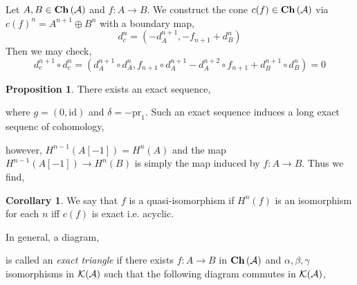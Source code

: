 \documentclass[12pt]{extarticle}
\newcommand{\id}{\mathrm{id}}
\theoremstyle{definition}
\newtheorem{proposition}[theorem]{Proposition}
\newtheorem{corollary}[theorem]{Corollary}
\newenvironment{definition}[1][Definition:]{\begin{trivlist}
\item[\hskip \labelsep {\bfseries #1}]}{\end{trivlist}}
\begin{document}
\begin{definition}
Let $A, B \in \mathbf{Ch}\left( \mathcal{A} \right)$ and $f : A \to B$. We construct the cone $c(f) \in \mathbf{Ch}\left( \mathcal{A} \right)$ via $c(f)^n = A^{n + 1} \oplus B^n$ with a boundary map,
\[ d_c^n = ( -d_A^{n+1}, -f_{n+1} + d_B^{n} ) \]
Then we may check,
\[ d_c^{n+1} \circ d_c^n = ( d_A^{n+1} \circ d_A^n, f_{n+1} \circ d_A^{n+1} - d_A^{n+2} \circ f_{n+1} + d_B^{n+1} \circ d_B^{n}) = 0 \]
\end{definition}

\begin{proposition}
There exists an exact sequence,
\begin{center}
\end{center}
where $g = (0, \id)$ and $\delta = - \mathrm{pr}_1$. Such an exact sequence induces a long exact sequenc of cohomology,
\begin{center}
\end{center}
however, $H^{n-1}(A[-1]) = H^n(A)$ and the map $H^{n-1}(A[-1]) \to H^n(B)$ is simply the map induced by $f : A \to B$. Thus we find,
\begin{center}
\end{center}
\end{proposition}

\begin{corollary}
We say that $f$ is a quasi-isomorphism if $H^n(f)$ is an isomorphism for each $n$ iff $c(f)$ is exact i.e. acyclic. 
\end{corollary}

\begin{definition}
In general, a diagram,
\begin{center}
\end{center}
is called an \textit{exact triangle} if there exists $f : A \to B$ in $\mathbf{Ch}\left( \mathcal{A} \right)$ and $\alpha, \beta, \gamma$ isomorphisms in $\mathcal{K}(\mathcal{A})$ such that the following diagram commutes in $\mathcal{K}(\mathcal{A})$,
\begin{center}
\end{center}
\end{definition}
\end{document}

